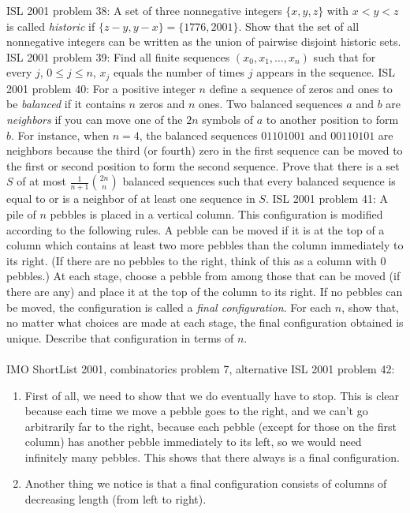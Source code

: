 ISL 2001 problem 38:  A set of three nonnegative integers $\{x,y,z\}$ with $x < y < z$ is called \textit{historic} if $\{z-y,y-x\} = \{1776,2001\}$.  Show that the set of all nonnegative integers can be written as the union of pairwise disjoint historic sets. 
ISL 2001 problem 39:  Find all finite sequences $(x_0, x_1, \ldots,x_n)$ such that for every $j$, $0 \leq j \leq n$, $x_j$ equals the number of times $j$ appears in the sequence. 
ISL 2001 problem 40:  For a positive integer $n$ define a sequence of zeros and ones to be \textit{balanced} if it contains $n$ zeros and $n$ ones. Two balanced sequences $a$ and $b$ are \textit{neighbors} if you can move one of the $2n$ symbols of $a$ to another position to form $b$. For instance, when $n = 4$, the balanced sequences $01101001$ and $00110101$ are neighbors because the third (or fourth) zero in the first sequence can be moved to the first or second position to form the second sequence. Prove that there is a set $S$ of at most $\frac{1}{n+1} \binom{2n}{n}$ balanced sequences such that every balanced sequence is equal to or is a neighbor of at least one sequence in $S$. 
ISL 2001 problem 41:  A pile of $n$ pebbles is placed in a vertical column. This configuration is modified according to the following rules. A pebble can be moved if it is at the top of a column which contains at least two more pebbles than the column immediately to its right. (If there are no pebbles to the right, think of this as a column with 0 pebbles.) At each stage, choose a pebble from among those that can be moved (if there are any) and place it at the top of the column to its right. If no pebbles can be moved, the configuration is called a \textit{final configuration}. For each $n$, show that, no matter what choices are made at each stage, the final configuration obtained is unique. Describe that configuration in terms of $n$. \\\\
IMO ShortList 2001, combinatorics problem 7, alternative 
ISL 2001 problem 42:  \begin{enumerate}[1)]
  \item First of all, we need to show that we do eventually have to stop. This is clear because each time we move a pebble goes to the right, and we can't go arbitrarily far to the right, because each pebble (except for those on the first column) has another pebble immediately to its left, so we would need infinitely many pebbles. This shows that there always is a final configuration.
  \item Another thing we notice is that a final configuration consists of columns of decreasing length (from left to right).
\end{enumerate}
